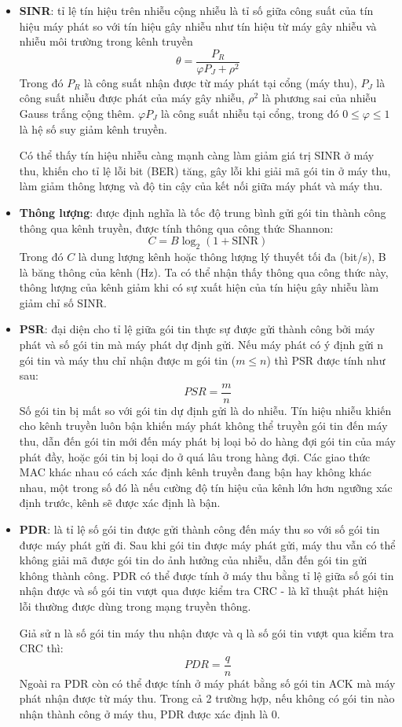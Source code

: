 \documentclass{uetgraduation}
\begin{document}
\begin{itemize}
    \item \textbf{SINR}: tỉ lệ tín hiệu trên nhiễu cộng nhiễu là tỉ số giữa công suất của tín hiệu máy phát so với tín hiệu gây nhiễu như
    tín hiệu từ máy gây nhiễu và nhiễu môi trường trong kênh truyền
    \[
    \theta = \frac{P_R}{\varphi P_J + \rho^2}
    \]
    Trong đó $P_R$ là công suất nhận được từ máy phát tại cổng (máy thu), $P_J$ là công suất nhiễu được phát của máy gây nhiễu, $\rho^2$ là phương sai
    của nhiễu Gauss trắng cộng thêm. $\varphi P_J$ là công suất nhiễu tại cổng, trong đó $0 \leq \varphi \leq 1$ là hệ số suy giảm kênh truyền.

    Có thể thấy tín hiệu nhiễu càng mạnh càng làm giảm giá trị SINR ở máy thu, khiến cho tỉ lệ lỗi bit (BER) tăng, gây lỗi khi giải mã gói tin ở máy thu,
    làm giảm thông lượng và độ tin cậy của kết nối giữa máy phát và máy thu.
    \item \textbf{Thông lượng}: được định nghĩa là tốc độ trung bình gửi gói tin thành công thông qua kênh truyền, được tính thông qua công thức Shannon:
    \[
    C = B \log_2(1 + \text{SINR})
    \]
    Trong đó $C$ là dung lượng kênh hoặc thông lượng lý thuyết tối đa (bit/s), B là băng thông của kênh (Hz). Ta có thể nhận thấy thông qua công thức này,
    thông lượng của kênh giảm khi có sự xuất hiện của tín hiệu gây nhiễu làm giảm chỉ số SINR.
    \item \textbf{PSR}: đại diện cho tỉ lệ giữa gói tin thực sự được gửi thành công bởi máy phát và số gói tin mà máy phát dự định gửi. Nếu máy phát có ý
    định gửi n gói tin và máy thu chỉ nhận được m gói tin ($m \leq n$) thì PSR được tính như sau:
    \[
    PSR = \frac{m}{n}
    \]
    Số gói tin bị mất so với gói tin dự định gửi là do nhiễu. Tín hiệu nhiễu khiến cho kênh truyền luôn bận khiến máy phát không thể truyền gói tin đến máy
    thu, dẫn đến gói tin mới đến máy phát bị loại bỏ do hàng đợi gói tin của máy phát đầy, hoặc gói tin bị loại do ở quá lâu trong hàng đợi. Các giao thức
    MAC khác nhau có cách xác định kênh truyền đang bận hay không khác nhau, một trong số đó là nếu cường độ tín hiệu của kênh lớn hơn ngưỡng xác định trước,
    kênh sẽ được xác định là bận.
    \item \textbf{PDR}: là tỉ lệ số gói tin được gửi thành công đến máy thu so với số gói tin được máy phát gửi đi. Sau khi gói tin được máy phát gửi, máy thu
    vẫn có thể không giải mã được gói tin do ảnh hưởng của nhiễu, dẫn đến gói tin gửi không thành công. PDR có thể được tính ở máy thu bằng tỉ lệ giữa số gói
    tin nhận được và số gói tin vượt qua được kiểm tra CRC - là kĩ thuật phát hiện lỗi thường được dùng trong mạng truyền thông.
    
    Giả sử n là số gói tin máy thu nhận được và q là số gói tin vượt qua kiểm tra CRC thì:
    \[
    PDR = \frac{q}{n}
    \]
    Ngoài ra PDR còn có thể được tính ở máy phát bằng số gói tin ACK mà máy phát nhận được từ máy thu. Trong cả 2 trường hợp, nếu không có gói tin nào nhận thành
    công ở máy thu, PDR được xác định là 0.
\end{itemize}
\end{document}
